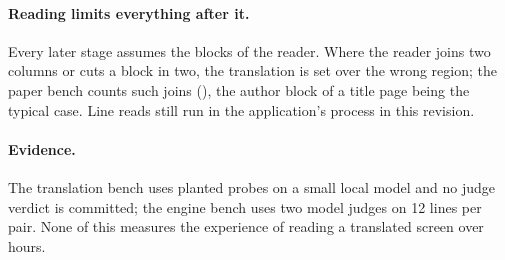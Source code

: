 \paragraph{Reading limits everything after it.} Every later stage assumes the blocks of the reader. Where the reader joins two columns or cuts a block in two, the
translation is set over the wrong region; the paper bench counts such joins (), the author block of a title page being the typical case.
Line reads still run in the application's process in this revision.

\paragraph{Evidence.} The translation bench uses planted probes on a small local model and no judge verdict is committed; the engine bench uses two model judges on 12 lines per pair.
None of this measures the experience of reading a translated screen over hours.
